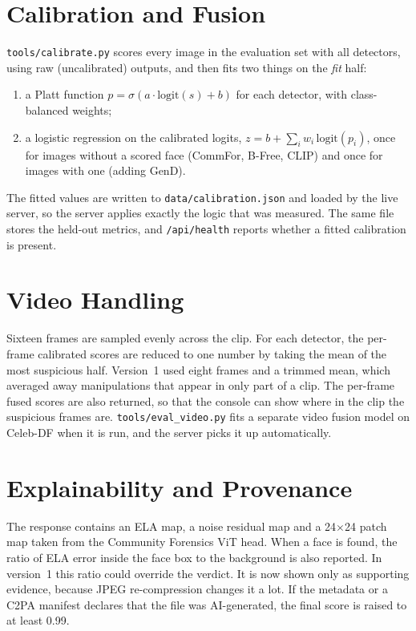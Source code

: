 \documentclass[12pt,a4paper,oneside]{report}
\begin{document}
\section{Calibration and Fusion}
\texttt{tools/calibrate.py} scores every image in the evaluation set with all detectors, using raw (uncalibrated) outputs, and then fits two things on the \emph{fit} half:
\begin{enumerate}
  \item a Platt function $p = \sigma(a \cdot \mathrm{logit}(s) + b)$ for each detector, with class-balanced weights;
  \item a logistic regression on the calibrated logits, $z = b + \sum_i w_i \, \mathrm{logit}(p_i)$, once for images without a scored face (CommFor, B-Free, CLIP) and once for images with one (adding GenD).
\end{enumerate}
The fitted values are written to \texttt{data/calibration.json} and loaded by the live server, so the server applies exactly the logic that was measured. The same file stores the held-out metrics, and \texttt{/api/health} reports whether a fitted calibration is present.

\section{Video Handling}
Sixteen frames are sampled evenly across the clip. For each detector, the per-frame calibrated scores are reduced to one number by taking the mean of the most suspicious half. Version~1 used eight frames and a trimmed mean, which averaged away manipulations that appear in only part of a clip. The per-frame fused scores are also returned, so that the console can show where in the clip the suspicious frames are. \texttt{tools/eval\_video.py} fits a separate video fusion model on Celeb-DF when it is run, and the server picks it up automatically.

\section{Explainability and Provenance}
The response contains an ELA map, a noise residual map and a 24$\times$24 patch map taken from the Community Forensics ViT head. When a face is found, the ratio of ELA error inside the face box to the background is also reported. In version~1 this ratio could override the verdict. It is now shown only as supporting evidence, because JPEG re-compression changes it a lot. If the metadata or a C2PA manifest declares that the file was AI-generated, the final score is raised to at least 0.99.
\end{document}
